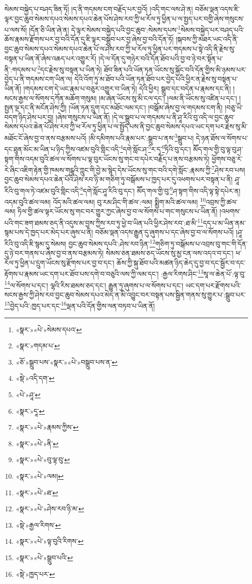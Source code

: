 སེམས་བསྐྱེད་པ་བཤད་ཟིན་ཏོ། །ད་ནི་གདམས་ངག་བརྗོད་པར་བྱའོ། །འདི་གང་ལས་ཤེ་ན། བཅོམ་ལྡན་འདས་ཇི་ལྟར་བྱང་ཆུབ་སེམས་དཔའ་སེམས་དཔའ་ཆེན་པོས་ཤེས་རབ་ཀྱི་ཕ་རོལ་ཏུ་ཕྱིན་པ་ལ་སྤྱད་པར་བགྱི་ཞེས་གསུངས་པ་ལས་སོ། །དོན་ཅི་ཡིན་ཞེ་ན། དེ་ལྟར་སེམས་བསྐྱེད་པའི་བྱང་ཆུབ་:སེམས་དཔས་\footnote{«སྣར་»«པེ་»སེམས་དཔའ་}སེམས་བསྐྱེད་པར་བཤད་པའི་ཆོས་རྣམས་རྫོགས་པར་བྱ་བའི་དོན་དུ་ཇི་ལྟར་བསྒྲུབ་པར་བྱ་ཞེས་བྱ་བའི་དོན་ཏོ། །སྐབས་ཀྱི་མཐར་ཡང་འདི་ནི་བྱང་ཆུབ་སེམས་དཔའ་སེམས་དཔའ་ཆེན་པོ་ལ་ཤེས་རབ་ཀྱི་ཕ་རོལ་ཏུ་ཕྱིན་པར་གདམས་པ་སྟེ་འདི་ནི་རྗེས་སུ་བསྟན་པ་ཡིན་ནོ་ཞེས་འཆད་པར་འགྱུར་རོ། །དེ་ལ་དོན་དུ་གཉེར་བའི་དོན་ཐོབ་པའི་བྱ་བ་ཉེ་བར་སྟོན་པ་ནི་:གདམས་པ་\footnote{«སྣར་»གདམ་པ་}དང་རྗེས་སུ་བསྟན་པ་ཡིན་ཏེ། ཐོབ་ཟིན་པའི་ཡོན་ཏན་ཡོངས་སུ་སྐྱོང་བའི་དོན་གྱིས་མི་ཉམས་པར་བྱེད་པ་ནི་གདམས་ངག་ཡིན་ལ། དེའི་འོག་ཏུ་མ་ཐོབ་པའི་ཡོན་ཏན་ཐོབ་པར་བྱེད་པའི་ཕྱིར་ན་རྗེས་སུ་བསྟན་པ་ཡིན་ནོ། །གདམས་ངག་དེ་ཡང་རྣམ་པ་བཅུར་འགྱུར་བ་ཡིན་ཏེ། དེའི་ཕྱིར། སྒྲུབ་དང་བདེན་པ་རྣམས་དང་ནི། །སངས་རྒྱས་ལ་སོགས་དཀོན་མཆོག་གསུམ། །མ་ཞེན་ཡོངས་སུ་མི་ངལ་དང་། །ལམ་ནི་ཡོངས་སུ་འཛིན་པ་དང་། །སྤྱན་ལྔ་དང་ནི་མངོན་ཤེས་ཀྱི། །ཡོན་ཏན་དྲུག་དང་མཐོང་ལམ་དང་། །བསྒོམ་ཞེས་བྱ་ལ་གདམས་ངག་ནི། །བཅུ་ཡི་བདག་ཉིད་ཤེས་པར་བྱ། །ཞེས་གསུངས་པ་ཡིན་ནོ། །དེ་ལ་སྒྲུབ་པ་ལ་གདམས་པ་ནི་ཤཱ་རིའི་བུ་འདི་ལ་བྱང་ཆུབ་སེམས་དཔའ་ཆེན་པོ་ཤེས་རབ་ཀྱི་ཕ་རོལ་ཏུ་ཕྱིན་པ་ལ་སྤྱོད་པས་ནི་བྱང་ཆུབ་སེམས་དཔའ་ཡང་དག་པར་རྗེས་སུ་མི་མཐོང་ངོ་ཞེས་བྱ་བ་ནས་བརྩམས་པའོ། །མི་དམིགས་པའི་རྣམ་པར་:སྒྲུབ་པ་ནས་\footnote{«ཅོ་»སྒྲུབ་པས་«སྣར་»«པེ་»བསྒྲུབ་པས་ན་}སྒྲུབ་པ། དེ་ཉན་ཐོས་ལ་སོགས་པ་དང་ཐུན་མོང་མ་ཡིན་པ་ཉིད་ཀྱིས་འཛམ་བུའི་གླིང་འདི་\footnote{«སྡེ་»འདི་དག་}དགེ་སློང་ཤ་\footnote{«པེ་»ཤཱ་}ར་དྭ་\footnote{«སྣར་»དཱ་}ཏིའི་བུ་དང་། མཽད་གལ་གྱི་བུ་ལྟ་བུ་ཤ་སྟག་གིས་འདམ་བུའི་ཚལ་ལ་སོགས་པ་ལྟ་བུར་ཡོངས་སུ་གང་བ་དཔེར་བརྗོད་པ་ནས་བརྩམས་ཏེ། ཕྱོགས་བཅུ་རེ་རེ་ཞིང་འཇིག་རྟེན་གྱི་ཁམས་གངྒཱའི་ཀླུང་གི་བྱེ་མ་སྙེད་དེས་ཡོངས་སུ་གང་བའི་དགེ་སློང་:རྣམས་ཀྱི་\footnote{«སྣར་»«པེ་»རྣམས་ཀྱིས་}ཤེས་རབ་པས། བྱང་ཆུབ་སེམས་དཔའ་ཆེན་པོའི་ཤེས་རབ་ཉི་མ་གཅིག་ཏུ་བསྒོམས་པ་ཁྱད་པར་དུ་འཕགས་པར་བསྟན་པ་ནི། ཤཱ་རིའི་བུ་གལ་ཏེ་འཛམ་བུའི་གླིང་འདི་\footnote{«སྣར་»«པེ་»ནི་}དགེ་སློང་ཤཱ་རིའི་བུ་དང་། མཽད་གལ་གྱི་བུ་\footnote{«སྣར་»«པེ་»བུ་ལྟ་བུ་}ཤ་སྟག་གིས་འདི་ལྟ་སྟེ་དཔེར་ན། འདམ་བུའི་ཚལ་ལམ། འོད་མའི་ཚལ་ལམ། བུ་རམ་ཤིང་གི་ཚལ་:ལམ། སྨྱིག་མའི་ཚལ་ལམ། \footnote{«སྣར་»«པེ་»ལམ།  }འབྲས་ཀྱི་ཚལ་ལམ། ཏིལ་གྱི་ཚལ་ལྟར་ཡོངས་སུ་གང་བར་གྱུར་ཀྱང་ཞེས་བྱ་བ་ལ་སོགས་པ་གང་གསུངས་པ་ཡིན་ནོ། །འཕགས་པའི་གང་ཟག་ཐམས་ཅད་ནི་འདུས་མ་བྱས་ཀྱིས་རབ་ཏུ་ཕྱེ་བ་ཡིན་པའི་ཕྱིར་ཤེས་རབ་:ཐ་མི་\footnote{«སྣར་»«པེ་»ཐ་}དད་པ་མ་ཡིན་ནམ་སྙམ་པས་དེ་ཁྱད་པར་མེད་པར་ཞུས་པ་ནི། བཅོམ་ལྡན་འདས་རྒྱུན་དུ་ཞུགས་པ་དང་ཞེས་བྱ་བ་ལ་སོགས་པའོ། །ཤཱ་རིའི་བུ་འདི་ཇི་སྙམ་དུ་སེམས། བྱང་ཆུབ་སེམས་དཔའི་:ཤེས་རབ་ཉིན་\footnote{«སྣར་»«པེ་»ཤེས་རབ་ཉི་མ་}གཅིག་ཏུ་བསྒོམས་པ་འབྲས་བུ་གང་གི་དོན་དུ་ཉེ་བར་གནས་པ་ཞེས་བྱ་བ་ནས་བརྩམས་ཏེ། སེམས་ཅན་ཐམས་ཅད་ཡོངས་སུ་མྱ་ངན་ལས་འདའ་བ་དང་། ཕ་རོལ་ཏུ་ཕྱིན་པ་དྲུག་ཡོངས་སུ་རྫོགས་པར་བྱ་བ་དང་། ཆོས་ཀྱི་སྐུ་ཐོབ་པའི་མཚན་ཉིད་ཆེད་དུ་བྱ་བ་དང་སྦྱོར་བ་དང་རྟོགས་པ་རྣམས་ཡང་དག་པར་ཐོབ་པས་དགེ་བ་བཅུའི་ལས་ཀྱི་ལམ་དང་། :རྒྱལ་རིགས་ཤིང་\footnote{«སྡེ་»རྒྱལ་རིགས་}སཱ་ལ་ཆེན་པོ་:ལྟ་བུ་\footnote{«སྣར་»«པེ་»ལྟ་བུའི་རིགས་}ལ་སོགས་པ་དང་། ལྷའི་རིས་ཐམས་ཅད་དང་། རྒྱུན་ཏུ་ཞུགས་པ་ལ་སོགས་པ་དང་། ཡང་དག་པར་རྫོགས་པའི་སངས་རྒྱས་ཀྱི་ཤེས་རབ་བྱང་ཆུབ་སེམས་དཔའ་མེད་ན་མི་འབྱུང་བར་བསྟན་པས་སྦྱིན་གནས་སུ་གྱུར་པ་:སྒྲུབ་པར་\footnote{«སྣར་»«པེ་»སྒྲུབ་པའི་}བྱེད་པའི་:ཁྱད་པར་དང་\footnote{«སྡེ་»ཁྱད་པར་}ལྡན་པའི་དོན་གྱིས་ལན་བཏབ་པ་ཡིན་ནོ། 
